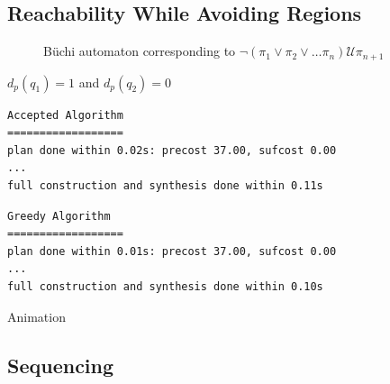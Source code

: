 \documentclass{beamer}
\newcommand{\U}{\bm{\mathcal{U}}}
\begin{document}
\subsection{Reachability While Avoiding Regions}
\begin{frame}[fragile]
\begin{figure}
\centering
{}
\caption{B\"{u}chi automaton corresponding to $\neg (\pi_1 \lor \pi_2 \lor \dots \pi_n) \U \pi_{n+1}$}
\end{figure}
\centering $d_p(q_1)=1$ and $d_p(q_2)=0$

\begingroup
\fontsize{9pt}{12pt}\selectfont
\begin{lstlisting}
Accepted Algorithm
==================
plan done within 0.02s: precost 37.00, sufcost 0.00
...
full construction and synthesis done within 0.11s
\end{lstlisting}
\endgroup
\begingroup
\fontsize{9pt}{12pt}\selectfont
\begin{lstlisting}
Greedy Algorithm
==================
plan done within 0.01s: precost 37.00, sufcost 0.00
...
full construction and synthesis done within 0.10s 
\end{lstlisting}
\endgroup



\end{frame}

\begin{frame}{Animation}
\end{frame}

\subsection{Sequencing}
\end{document}
